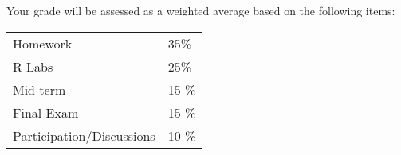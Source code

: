 Your grade will be assessed as a weighted average based on the following items: 


 \vspace{.1in}

\begin{tabular}{ll}
Homework & 35\% \\
R Labs  & 25\% \\
Mid term & 15 \%\\
Final Exam & 15 \%    \\
Participation/Discussions & 10 \% \\
\end{tabular}
\vspace{.1in}





